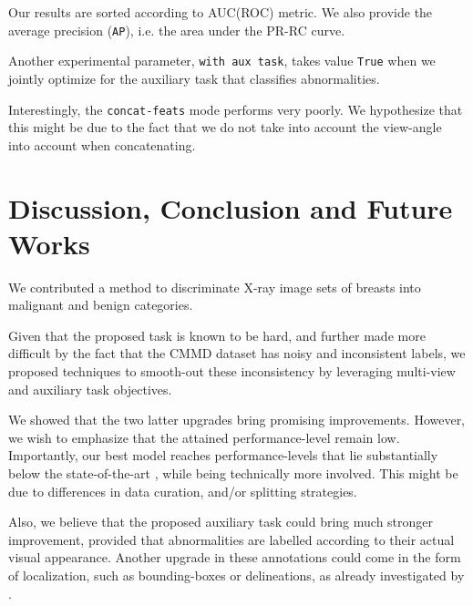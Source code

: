 \documentclass[11pt]{article}
\begin{document}
Our results are sorted according to AUC(ROC) metric.
We also provide the average precision (\texttt{AP}), i.e. the area under the PR-RC curve.

Another experimental parameter, \texttt{with aux task}, takes value \texttt{True} when we jointly optimize for the
auxiliary task that classifies abnormalities.

Interestingly, the \texttt{concat-feats} mode performs very poorly.
We hypothesize that this might be due to the fact
that we do not take into account the view-angle into account when
concatenating.

\section{Discussion, Conclusion and Future Works}
\label{sec:org83c54a7}

We contributed a method to discriminate X-ray image sets of breasts into malignant and benign
categories.

Given that the proposed task is known to be hard, and further made more difficult by
the fact that the CMMD dataset has noisy and inconsistent labels,
we proposed techniques to smooth-out these inconsistency by leveraging multi-view and
auxiliary task objectives.

We showed that the two latter upgrades bring promising improvements.
However, we wish to emphasize that the attained performance-level remain low.
Importantly, our best model reaches performance-levels that lie substantially
below the state-of-the-art \autocite{tardy22}, while being technically more involved.
This might be due to differences in data curation, and/or splitting strategies.

Also, we believe that the proposed auxiliary task could bring much stronger
improvement, provided that abnormalities are labelled according to their actual
visual appearance. Another upgrade in these annotations could come in the form
of localization, such as bounding-boxes or delineations, as already investigated by \autocite{tang19}.



\printbibliography
\end{document}
